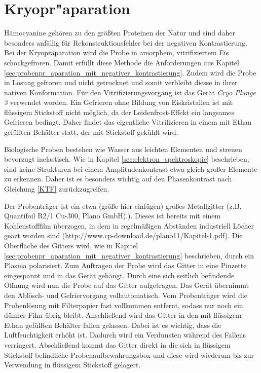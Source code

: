 \section{Kryopr"aparation}
\label{sec:probenpr_aparation_mit_kryopr_aparation}

Hämocyanine gehören zu den größten Proteinen der Natur und sind daher besonders anfällig für Rekonstruktionsfehler bei der negativen Kontrastierung.
Bei der Kryopräparation wird die Probe in amorphem, vitrifiziertem Eis schockgefroren.
Damit erfüllt diese Methode die Anforderungen aus Kapitel \ref{sec:probenpr_aparation_mit_negativer_kontrastierung}.
Zudem wird die Probe in Lösung gefroren und nicht getrocknet und somit verbleibt diesse in ihrer nativen Konformation.
Für den Vitrifizierungsvorgang ist das Gerät \textit{Cryo Plunge 3} verwendet worden.
Ein Gefrieren ohne Bildung von Eiskristallen ist mit flüssigem Stickstoff nicht möglich, da der Leidenfrost-Effekt ein langsames Gefrieren bedingt.
Daher findet das eigentliche Vitrifizieren in einem mit Ethan gefüllten Behälter statt, der mit Stickstoff gekühlt wird.

Biologische Proben bestehen wie Wasser aus leichten Elementen und streuen bevorzugt inelastisch.
Wie in Kapitel \ref{sec:elektron_spektroskopie} beschrieben, sind keine Strukturen bei einem Amplitudenkontrast etwa gleich großer Elemente zu erkennen.
Daher ist es besonders wichtig auf den Phasenkontrast nach Gleichung \eqref{KTF} zurückzugreifen.

Der Probenträger ist ein etwa (größe hier einfügen) großes Metallgitter (z.B. Quantifoil R2/1 Cu-300, Plano GmbH).).
Dieses ist bereits mit einem Kohlenstofffilm überzogen, in dem in regelmäßigen Abständen industriell Löcher geäzt worden sind (http://www.cp-download.de/plano11/Kapitel-1.pdf).
Die Oberfläche des Gitters wird, wie in Kapitel \ref{sec:probenpr_aparation_mit_negativer_kontrastierung} beschrieben, durch ein Plasma polarisiert.
Zum Auftragen der Probe wird das Gitter in eine Pinzette eingespannt und in das Gerät gehängt.
Durch eine sich seitlich befindende Öffnung wird nun die Probe auf das Gitter aufgetragen.
Das Gerät übernimmt den Ablösch- und Gefriervorgang vollautomatisch.
Vom Probenträger wird die Probenlösung mit Filterpapier fast vollkommen entfernt, sodass nur noch ein dünner Film übrig bleibt.
Anschließend wird das Gitter in den mit flüssigem Ethan gefüllten Behälter fallen gelassen.
Dabei ist es wichtig, dass die Luftfeuchtigkeit erhöht ist.
Dadurch wird ein Verdunsten während des Fallens verringert.
Abschließend kommt das Gitter direkt in die sich in flüssigem Stickstoff befindliche Probenaufbewahrungsbox und diese wird wiederum bis zur Verwendung in flüssigem Stickstoff gelagert.

\FloatBarrier